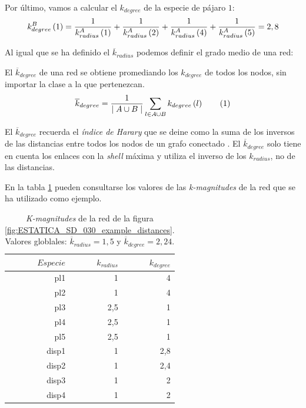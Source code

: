 Por último, vamos a calcular el $k_{degree}$ de la especie de pájaro $1$:
\begin{equation}
k^B_{degree}\left(1\right) = \frac{1}{k^A_{radius}\left(1\right)} + \frac{1}{k^A_{radius}\left(2\right)} + \frac{1}{k^A_{radius}\left(4\right)} + \frac{1}{k^A_{radius}\left(5\right)} = \\
 2,8
\label{example_kdegree}
\end{equation}

Al igual que se ha definido el $\overline k_{radius}$ podemos definir el grado medio de una red:
\begin{theo} 
El \textit{$\overline k_{degree}$} de una red se obtiene promediando los ${k}_{degree}$ de todos los nodos, sin importar la clase a la que pertenezcan.
\begin{align*}
\displaystyle
\overline {k}_{degree} = \frac{1}{\mid A \cup B \mid}\sum\limits_{l \in A \cup B} k_{degree}\left(l\right)
\stepcounter{equation}\tag{\theequation}\label{avgkdegree}
\end{align*}
\label{ESTATICA_avgkdegree}
\end{theo}

El  $\overline k_{degree}$ recuerda el \textit{índice de Harary} que se deine como la suma de los inversos de las distancias entre todos los nodos de un grafo conectado \cite{plavvsic1993harary}. El  $\overline k_{degree}$ solo tiene en cuenta los enlaces con la \textit{shell} máxima y utiliza el inverso de los $k_{radius}$, no de las distancias.

En la tabla \ref{table:table_SD_030} pueden consultarse los valores de las \textit{k-magnitudes} de la red que se ha utilizado como ejemplo.

\begin{table}[htbp]
\small
  \centering
    \begin{tabular}{rrr}
    \toprule
    $Especie$ & $k_{radius}$ & $k_{degree}$  \\
    \midrule
    pl1  & 1    & 4 \\
    pl2  & 1    & 4 \\
    pl3  & 2,5  & 1 \\
    pl4  & 2,5  & 1 \\
    pl5  & 2,5  & 1 \\
    disp1 & 1    & 2,8 \\
    disp2 & 1    & 2,4 \\
    disp3 & 1    & 2 \\
    disp4 & 1    & 2 \\
    \bottomrule
    \end{tabular}%
  \caption{\label{table:table_SD_030} \textit{K-magnitudes} de la red de la figura \ref{fig:ESTATICA_SD_030_example_distances}. Valores globlales: $\overline k_{radius} = 1,5 $ y $\overline k_{degree} = 2,24$.}
\end{table}%

